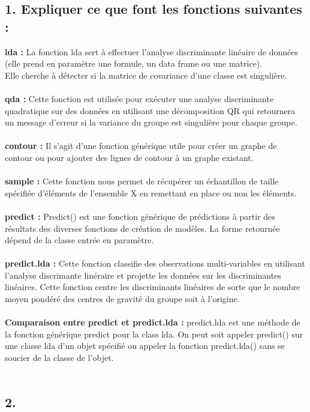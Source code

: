 \documentclass[a4paper, 10pt]{article}
\begin{document}
\subsection*{1. Expliquer ce que font les fonctions suivantes :}
\textbf{lda :} La fonction lda sert à effectuer l'analyse discriminante linéaire de données
(elle prend en paramètre une formule, un data frame ou une matrice).\\
Elle cherche à détecter si la matrice de covariance d'une classe est singulière.\\ \\
\textbf{qda :} Cette fonction est utilisée pour exécuter une analyse discriminante quadratique sur des données
en utilisant une décomposition QR qui retournera un message d'erreur si la variance du groupe est singulière pour chaque groupe.\\ \\
\textbf{contour :} Il s'agit d'une fonction générique utile pour créer un graphe de contour ou
pour ajouter des lignes de contour à un graphe existant.\\ \\
\textbf{sample :} Cette fonction nous permet de récupérer un échantillon de taille spécifiée d'éléments de l'ensemble X
en remettant en place ou non les éléments.\\ \\
\textbf{predict :} Predict() est une fonction générique de prédictions à partir des résultats des diverses fonctions de création de modèles.
La forme retournée dépend de la classe entrée en paramètre.\\ \\
\textbf{predict.lda :} Cette fonction classifie des observations multi-variables en utilisant l'analyse discrimante linéraire et
projette les données sur les discriminantes linéaires.
Cette fonction centre les discriminants linéaires de sorte que le nombre moyen pondéré des centres de gravité du groupe soit à l'origine.\\ \\
\textbf{Comparaison entre predict et predict.lda :} predict.lda est une méthode de la fonction générique predict pour la class lda.
On peut soit appeler predict() sur une classe lda d'un objet spécifié ou
appeler la fonction predict.lda() sans se soucier de la classe de l'objet.\\ \\

\subsection*{2.}
\end{document}
